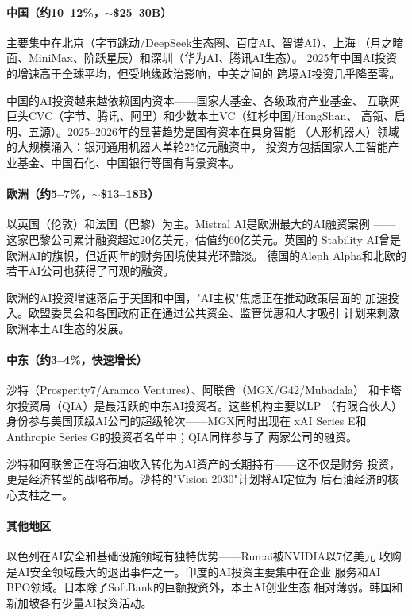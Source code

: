 \paragraph{中国（约10--12\%，$\sim$\$25--30B）}

主要集中在北京（字节跳动/DeepSeek生态圈、百度AI、智谱AI）、上海
（月之暗面、MiniMax、阶跃星辰）和深圳（华为AI、腾讯AI生态）。
2025年中国AI投资的增速高于全球平均，但受地缘政治影响，中美之间的
跨境AI投资几乎降至零。

中国的AI投资越来越依赖国内资本——国家大基金、各级政府产业基金、
互联网巨头CVC（字节、腾讯、阿里）和少数本土VC（红杉中国/HongShan、
高瓴、启明、五源）。2025--2026年的显著趋势是国有资本在具身智能
（人形机器人）领域的大规模涌入：银河通用机器人单轮25亿元融资中，
投资方包括国家人工智能产业基金、中国石化、中国银行等国有背景资本。

\paragraph{欧洲（约5--7\%，$\sim$\$13--18B）}

以英国（伦敦）和法国（巴黎）为主。Mistral AI是欧洲最大的AI融资案例
——这家巴黎公司累计融资超过20亿美元，估值约60亿美元。英国的
Stability AI曾是欧洲AI的旗帜，但近两年的财务困境使其光环黯淡。
德国的Aleph Alpha和北欧的若干AI公司也获得了可观的融资。

欧洲的AI投资增速落后于美国和中国，"AI主权"焦虑正在推动政策层面的
加速投入。欧盟委员会和各国政府正在通过公共资金、监管优惠和人才吸引
计划来刺激欧洲本土AI生态的发展。

\paragraph{中东（约3--4\%，快速增长）}

沙特（Prosperity7/Aramco Ventures）、阿联酋（MGX/G42/Mubadala）
和卡塔尔投资局（QIA）是最活跃的中东AI投资者。这些机构主要以LP
（有限合伙人）身份参与美国顶级AI公司的超级轮次——MGX同时出现在
xAI Series E和Anthropic Series G的投资者名单中；QIA同样参与了
两家公司的融资。

沙特和阿联酋正在将石油收入转化为AI资产的长期持有——这不仅是财务
投资，更是经济转型的战略布局。沙特的"Vision 2030"计划将AI定位为
后石油经济的核心支柱之一。

\paragraph{其他地区}

以色列在AI安全和基础设施领域有独特优势——Run:ai被NVIDIA以7亿美元
收购是AI安全领域最大的退出事件之一。印度的AI投资主要集中在企业
服务和AI BPO领域。日本除了SoftBank的巨额投资外，本土AI创业生态
相对薄弱。韩国和新加坡各有少量AI投资活动。


